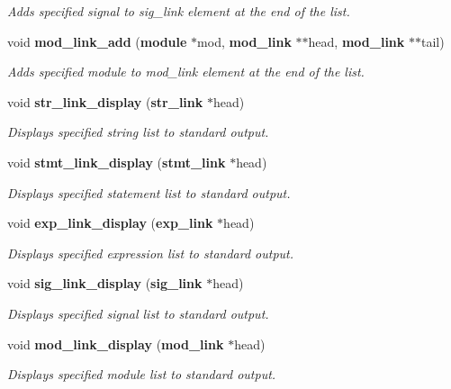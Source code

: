 \begin{CompactItemize}
\begin{CompactList}\small\item\em Adds specified signal to sig\_\-link element at the end of the list. \item\end{CompactList}\item 
void {\bf mod\_\-link\_\-add} ({\bf module} $\ast$mod, {\bf mod\_\-link} $\ast$$\ast$head, {\bf mod\_\-link} $\ast$$\ast$tail)
\begin{CompactList}\small\item\em Adds specified module to mod\_\-link element at the end of the list. \item\end{CompactList}\item 
void {\bf str\_\-link\_\-display} ({\bf str\_\-link} $\ast$head)
\begin{CompactList}\small\item\em Displays specified string list to standard output. \item\end{CompactList}\item 
void {\bf stmt\_\-link\_\-display} ({\bf stmt\_\-link} $\ast$head)
\begin{CompactList}\small\item\em Displays specified statement list to standard output. \item\end{CompactList}\item 
void {\bf exp\_\-link\_\-display} ({\bf exp\_\-link} $\ast$head)
\begin{CompactList}\small\item\em Displays specified expression list to standard output. \item\end{CompactList}\item 
void {\bf sig\_\-link\_\-display} ({\bf sig\_\-link} $\ast$head)
\begin{CompactList}\small\item\em Displays specified signal list to standard output. \item\end{CompactList}\item 
void {\bf mod\_\-link\_\-display} ({\bf mod\_\-link} $\ast$head)
\begin{CompactList}\small\item\em Displays specified module list to standard output. \item\end{CompactList}\item 

\end{CompactItemize}
